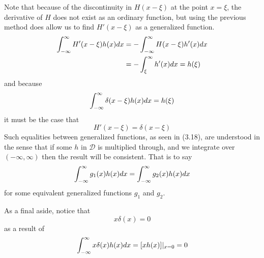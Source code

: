 Note that because of the discontinuity in \(H(x-\xi)\) at the point \(x=\xi\), the derivative of \(H\) does not exist as an ordinary function, but using the previous method does allow us to find \(H'(x-\xi)\) as a generalized function. 
\begin{equation}
    \begin{split}
        \int_{-\infty}^{\infty} H'(x-\xi)h(x)dx &= -\int_{-\infty}^{\infty} H(x-\xi)h'(x)dx\\
        &=-\int_{\xi}^{\infty}h'(x)dx = h(\xi)
    \end{split}
\end{equation}
and because
\begin{equation}
    \int_{-\infty}^{\infty} \delta(x-\xi)h(x)dx=h(\xi)
\end{equation}
it must be the case that
\begin{equation}
    H'(x-\xi) = \delta(x-\xi)
\end{equation}
Such equalities between generalized functions, as seen in (3.18), are understood in the sense that if some \(h\) in \(\mathcal{D}\) is multiplied through, and we integrate over \((-\infty, \infty)\) then the result will be consistent. That is to say
\begin{equation}
    \int_{-\infty}^{\infty} g_1(x)h(x)dx = \int_{-\infty}^{\infty} g_2(x)h(x)dx
\end{equation}
for some equivalent generalized functions \(g_1\) and \(g_2\).

As a final aside, notice that
\begin{equation}
    x\delta(x)=0
\end{equation}
as a result of
\begin{equation}
    \int_{-\infty}^{\infty} x\delta(x)h(x)dx=[xh(x)]|_{x=0} = 0
\end{equation}